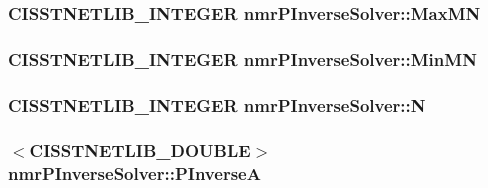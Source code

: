 \subsubsection[{Max\+M\+N}]{\setlength{\rightskip}{0pt plus 5cm}C\+I\+S\+S\+T\+N\+E\+T\+L\+I\+B\+\_\+\+I\+N\+T\+E\+G\+E\+R nmr\+P\+Inverse\+Solver\+::\+Max\+M\+N\hspace{0.3cm}{\ttfamily [protected]}}\label{classnmr_p_inverse_solver_aafd3d099ed0e477769c41645744c3acd}
\hypertarget{classnmr_p_inverse_solver_a28485b3520282846c1b0e6f1137da9b2}{}
\subsubsection[{Min\+M\+N}]{\setlength{\rightskip}{0pt plus 5cm}C\+I\+S\+S\+T\+N\+E\+T\+L\+I\+B\+\_\+\+I\+N\+T\+E\+G\+E\+R nmr\+P\+Inverse\+Solver\+::\+Min\+M\+N\hspace{0.3cm}{\ttfamily [protected]}}\label{classnmr_p_inverse_solver_a28485b3520282846c1b0e6f1137da9b2}
\hypertarget{classnmr_p_inverse_solver_a79a6789487c6022865700e2b4171ce60}{}
\subsubsection[{N}]{\setlength{\rightskip}{0pt plus 5cm}C\+I\+S\+S\+T\+N\+E\+T\+L\+I\+B\+\_\+\+I\+N\+T\+E\+G\+E\+R nmr\+P\+Inverse\+Solver\+::\+N\hspace{0.3cm}{\ttfamily [protected]}}\label{classnmr_p_inverse_solver_a79a6789487c6022865700e2b4171ce60}
\hypertarget{classnmr_p_inverse_solver_ae5a338f8aca820d47ac15fae99f29725}{}
\subsubsection[{P\+Inverse\+A}]{$<$C\+I\+S\+S\+T\+N\+E\+T\+L\+I\+B\+\_\+\+D\+O\+U\+B\+L\+E$>$ nmr\+P\+Inverse\+Solver\+::\+P\+Inverse\+A\hspace{0.3cm}{\ttfamily [protected]}}\label{classnmr_p_inverse_solver_ae5a338f8aca820d47ac15fae99f29725}
\hypertarget{classnmr_p_inverse_solver_a76d3263b528c5531acbffe5909e716bd}{}
